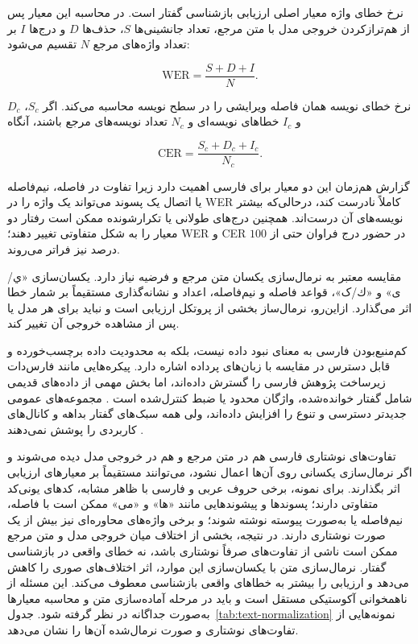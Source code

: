 
نرخ خطای واژه معیار اصلی ارزیابی بازشناسی گفتار است. در محاسبه این معیار پس از هم‌ترازکردن خروجی مدل با متن مرجع، تعداد جانشینی‌ها $S$، حذف‌ها $D$ و درج‌ها $I$ بر تعداد واژه‌های مرجع $N$ تقسیم می‌شود:

\begin{equation}
\mathrm{WER}=\frac{S+D+I}{N}.
\end{equation}

نرخ خطای نویسه همان فاصله ویرایشی را در سطح نویسه محاسبه می‌کند. اگر $S_c$، $D_c$ و $I_c$ خطاهای نویسه‌ای و $N_c$ تعداد نویسه‌های مرجع باشند، آنگاه

\begin{equation}
\mathrm{CER}=\frac{S_c+D_c+I_c}{N_c}.
\end{equation}

گزارش هم‌زمان این دو معیار برای فارسی اهمیت دارد زیرا تفاوت در فاصله، نیم‌فاصله یا اتصال یک پسوند می‌تواند یک واژه را در WER کاملاً نادرست کند، درحالی‌که بیشتر نویسه‌های آن درست‌اند. همچنین درج‌های طولانی یا تکرارشونده ممکن است رفتار دو معیار را به شکل متفاوتی تغییر دهند؛ WER و CER در حضور درج فراوان حتی از $100$ درصد نیز فراتر می‌روند.

مقایسه معتبر به نرمال‌سازی یکسان متن مرجع و فرضیه نیاز دارد. یکسان‌سازی «ي/ی» و «ك/ک»، قواعد فاصله و نیم‌فاصله، اعداد و نشانه‌گذاری مستقیماً بر شمار خطا اثر می‌گذارد. ازاین‌رو، نرمال‌ساز بخشی از پروتکل ارزیابی است و نباید برای هر مدل یا پس از مشاهده خروجی آن تغییر کند.




کم‌منبع‌بودن فارسی به معنای نبود داده نیست، بلکه به محدودیت داده برچسب‌خورده و قابل دسترس در مقایسه با زبان‌های پرداده اشاره دارد. پیکره‌هایی مانند فارس‌دات زیرساخت پژوهش فارسی را گسترش داده‌اند، اما بخش مهمی از داده‌های قدیمی شامل گفتار خوانده‌شده، واژگان محدود یا ضبط کنترل‌شده است . مجموعه‌های عمومی جدیدتر دسترسی و تنوع را افزایش داده‌اند، ولی همه سبک‌های گفتار بداهه و کانال‌های کاربردی را پوشش نمی‌دهند .

تفاوت‌های نوشتاری فارسی هم در متن مرجع و هم در خروجی مدل دیده می‌شوند و اگر نرمال‌سازی یکسانی روی آن‌ها اعمال نشود، می‌توانند مستقیماً بر معیارهای ارزیابی اثر بگذارند. برای نمونه، برخی حروف عربی و فارسی با ظاهر مشابه، کدهای یونی‌کد متفاوتی دارند؛ پسوندها و پیشوندهایی مانند «ها» و «می» ممکن است با فاصله، نیم‌فاصله یا به‌صورت پیوسته نوشته شوند؛ و برخی واژه‌های محاوره‌ای نیز بیش از یک صورت نوشتاری دارند. در نتیجه، بخشی از اختلاف میان خروجی مدل و متن مرجع ممکن است ناشی از تفاوت‌های صرفاً نوشتاری باشد، نه خطای واقعی در بازشناسی گفتار. نرمال‌سازی متن با یکسان‌سازی این موارد، اثر اختلاف‌های صوری را کاهش می‌دهد و ارزیابی را بیشتر به خطاهای واقعی بازشناسی معطوف می‌کند. این مسئله از ناهمخوانی آکوستیکی مستقل است و باید در مرحله آماده‌سازی متن و محاسبه معیارها به‌صورت جداگانه در نظر گرفته شود. جدول~\ref{tab:text-normalization} نمونه‌هایی از تفاوت‌های نوشتاری و صورت نرمال‌شده آن‌ها را نشان می‌دهد.

